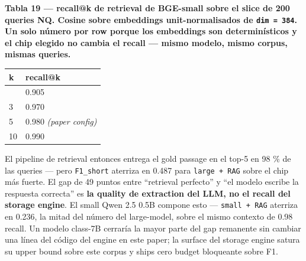 \textbf{Tabla 19 --- recall@k de retrieval de BGE-small sobre el slice de 200
queries NQ. Cosine sobre embeddings unit-normalisados de \texttt{dim\ =\ 384}.
Un solo número por row porque los embeddings son determinísticos y el chip
elegido no cambia el recall --- mismo modelo, mismo corpus, mismas queries.}

{\def\LTcaptype{none} %
\begin{longtable}[]{@{}ll@{}}
\toprule\noalign{}
k & recall@k \\
\midrule\noalign{}
\endhead
\bottomrule\noalign{}
\endlastfoot
1 & 0.905 \\
3 & 0.970 \\
5 & 0.980 \emph{(paper config)} \\
10 & 0.990 \\
\end{longtable}
}

El pipeline de retrieval entonces entrega el gold passage en el top-5 en 98 \%
de las queries --- pero \texttt{F1\_short} aterriza en 0.487 para
\texttt{large\ +\ RAG} sobre el chip más fuerte. El gap de 49 puntos entre
``retrieval perfecto'' y ``el modelo escribe la respuesta correcta'' es
\textbf{la quality de extraction del LLM, no el recall del storage engine}. El
small Qwen 2.5 0.5B compone esto --- \texttt{small\ +\ RAG} aterriza en 0.236,
la mitad del número del large-model, sobre el mismo contexto de 0.98 recall. Un
modelo class-7B cerraría la mayor parte del gap remanente sin cambiar una línea
del código del engine en este paper; la surface del storage engine satura su
upper bound sobre este corpus y ships cero budget bloqueante sobre F1.

